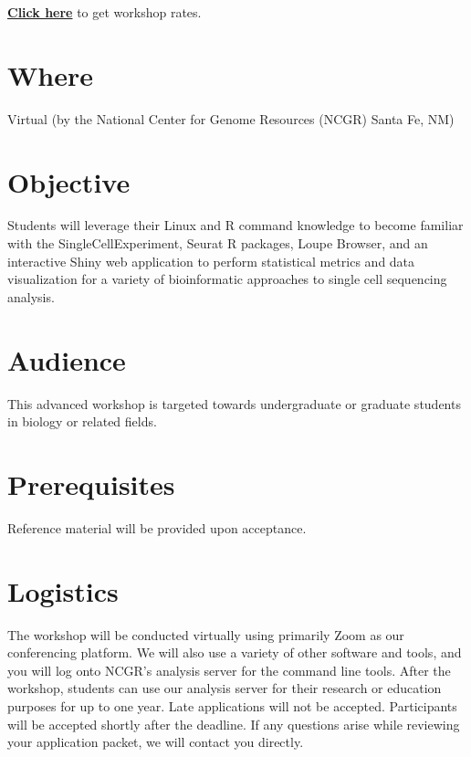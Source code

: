 \documentclass[
]{book}
\begin{document}
\href{https://inbre.ncgr.org/ncgr-workshops/workshop-rates.html}{\textbf{Click here}} to get workshop rates.

\hypertarget{where-1}{%
\section*{Where}\label{where-1}}

Virtual (by the National Center for Genome Resources (NCGR) Santa Fe, NM)

\hypertarget{objective-1}{%
\section*{Objective}\label{objective-1}}

Students will leverage their Linux and R command knowledge to become familiar with the SingleCellExperiment, Seurat R packages, Loupe Browser, and an interactive Shiny web application to perform statistical metrics and data visualization for a variety of bioinformatic approaches to single cell sequencing analysis.

\hypertarget{audience-1}{%
\section*{Audience}\label{audience-1}}

This advanced workshop is targeted towards undergraduate or graduate students in biology or related fields.

\hypertarget{prerequisites-1}{%
\section*{Prerequisites}\label{prerequisites-1}}

Reference material will be provided upon acceptance.

\hypertarget{logistics-1}{%
\section*{Logistics}\label{logistics-1}}

The workshop will be conducted virtually using primarily Zoom as our conferencing platform. We will also use a variety of other software and tools, and you will log onto NCGR's analysis server for the command line tools. After the workshop, students can use our analysis server for their research or education purposes for up to one year. Late applications will not be accepted. Participants will be accepted shortly after the deadline. If any questions arise while reviewing your application packet, we will contact you directly.
\end{document}
